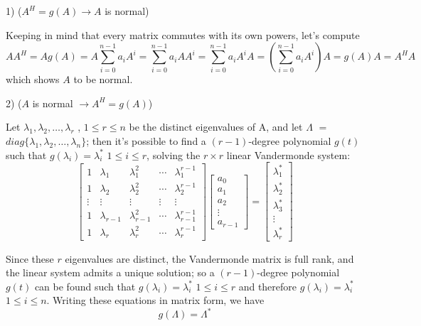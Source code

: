 \documentclass[12pt]{article}
\begin{document}
1) ($A^H=g(A)\rightarrow A$ is normal)

Keeping in mind that every matrix commutes with its own powers, let's compute
\[
AA^H=Ag(A)=A\sum_{i=0}^{n-1}a_iA^i=\sum_{i=0}^{n-1}a_iAA^i=\sum_{i=0}^{n-1}a_iA^iA=\left(\sum_{i=0}^{n-1}a_iA^i\right)A=g(A)A=A^HA
\]
which shows $A$ to be normal.

2) ($A$ is normal $\rightarrow A^H=g(A)$)

Let $\lambda _{1},\lambda _{2}, \ldots,\lambda _{r}$ , $1\leq
r\leq n$ be the distinct eigenvalues of A, and let $\Lambda $ $=$ $%
diag\{\lambda _{1},\lambda _{2}, \ldots,\lambda _{n}\}$; then it's possible to
find a $(r-1)$-degree polynomial $g(t)$ such that $g(\lambda _{i})=\lambda
_{i}^{\ast }$ $1\leq i\leq r$, solving the $r\times r$ linear Vandermonde
system:
\[
\begin{bmatrix}
1 & \lambda _{1} & \lambda _{1}^{2} & \cdots & \lambda _{1}^{r-1} \\ 
1 & \lambda _{2} & \lambda _{2}^{2} & \cdots & \lambda _{2}^{r-1} \\ 
\vdots & \vdots & \vdots & \vdots & \vdots \\ 
1 & \lambda _{r-1} & \lambda _{r-1}^{2} & \cdots & \lambda _{r-1}^{r-1} \\ 
1 & \lambda _{r} & \lambda _{r}^{2} & \cdots & \lambda _{r}^{r-1}%
\end{bmatrix}%
\begin{bmatrix}
a_{0} \\ 
a_{1} \\ 
a_{2} \\ 
\vdots \\ 
a_{r-1}%
\end{bmatrix}%
=%
\begin{bmatrix}
\lambda _{1}^{\ast } \\ 
\lambda _{2}^{\ast } \\ 
\lambda _{3}^{\ast } \\ 
\vdots \\ 
\lambda _{r}^{\ast }%
\end{bmatrix}%
\]

Since these $r$ eigenvalues are distinct, the Vandermonde matrix is full
rank, and the linear system admits a unique solution; so a $(r-1)$-degree
polynomial $g(t)$ can be found such that $g(\lambda _{i})=\lambda _{i}^{\ast
}$ $1\leq i\leq r$ and therefore $g(\lambda _{i})=\lambda _{i}^{\ast }$ $%
1\leq i\leq n$. Writing these equations in matrix form, we have%
\begin{equation*}
g(\Lambda )=\Lambda ^{\ast }
\end{equation*}
\end{document}
